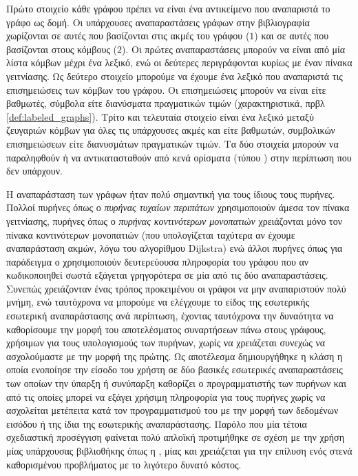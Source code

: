 Πρώτο στοιχείο κάθε γράφου πρέπει να είναι ένα αντικείμενο που αναπαριστά το γράφο ως δομή.
Οι υπάρχουσες αναπαραστάσεις γράφων στην βιβλιογραφία χωρίζονται σε αυτές που βασίζονται στις ακμές του γράφου ($1$) και σε αυτές που βασίζονται στους κόμβους ($2$).
Οι πρώτες αναπαραστάσεις μπορούν να είναι από μία λίστα κόμβων μέχρι ένα λεξικό, ενώ οι δεύτερες περιγράφονται κυρίως με έναν πίνακα γειτνίασης.
Ως δεύτερο στοιχείο μπορούμε να έχουμε ένα λεξικό που αναπαριστά τις επισημειώσεις των κόμβων του γράφου. Οι επισημειώσεις μπορούν να είναι είτε βαθμωτές, σύμβολα είτε διανύσματα πραγματικών τιμών (χαρακτηριστικά, πρβλ \ref{def:labeled_graphs}).
Τρίτο και τελευταία στοιχείο είναι ένα λεξικό μεταξύ ζευγαριών κόμβων για όλες τις υπάρχουσες ακμές και είτε βαθμωτών, συμβολικών επισημειώσεων είτε διανυσμάτων πραγματικών τιμών.
Τα δύο στοιχεία μπορούν να παραληφθούν ή να αντικατασταθούν από κενά ορίσματα (τύπου ) στην περίπτωση που δεν υπάρχουν.

Η αναπαράσταση των γράφων ήταν πολύ σημαντική για τους ίδιους τους πυρήνες.
Πολλοί πυρήνες όπως ο \textit{πυρήνας τυχαίων περιπάτων} χρησιμοποιούν άμεσα τον πίνακα γειτνίασης, πυρήνες όπως ο \textit{πυρήνας κοντινότερων μονοπατιών} χρειάζονται μόνο τον πίνακα κοντινότερων μονοπατιών (που υπολογίζεται ταχύτερα αν έχουμε αναπαράσταση ακμών, λόγω του αλγορίθμου Dijkstra) ενώ άλλοι πυρήνες όπως για παράδειγμα ο  χρησιμοποιούν δευτερεύουσα πληροφορία του γράφου που αν κωδικοποιηθεί σωστά εξάγεται γρηγορότερα σε μία από τις δύο αναπαραστάσεις.
Συνεπώς χρειάζονταν ένας τρόπος προκειμένου οι γράφοι να μην αναπαριστούν πολύ μνήμη, ενώ ταυτόχρονα να μπορούμε να ελέγχουμε το είδος της εσωτερικής εσωτερική αναπαράστασης ανά περίπτωση, έχοντας ταυτόχρονα την δυναότητα να καθορίσουμε την μορφή του αποτελέσματος συναρτήσεων πάνω στους γράφους, χρήσιμων για τους υπολογισμούς των πυρήνων, χωρίς να χρειάζεται συνεχώς να ασχολούμαστε με την μορφή της πρώτης.
Ως αποτέλεσμα δημιουργήθηκε η κλάση  η οποία ενοποίησε την είσοδο του χρήστη σε δύο βασικές εσωτερικές αναπαραστάσεις των οποίων την ύπαρξη ή συνύπαρξη καθορίζει ο προγραμματιστής των πυρήνων και από τις οποίες μπορεί να εξάγει χρήσιμη πληροφορία για τους πυρήνες χωρίς να ασχολείται μετέπειτα κατά τον προγραμματισμού του με την μορφή των δεδομένων εισόδου ή της ίδια της εσωτερικής αναπαράστασης.
Παρόλο που μία τέτοια σχεδιαστική προσέγγιση φαίνεται πολύ απλοϊκή προτιμήθηκε σε σχέση με την χρήση μίας υπάρχουσας βιβλιοθήκης όπως η , μίας και χρειάζεται για την επίλυση ενός στενά καθορισμένου προβλήματος με το λιγότερο δυνατό κόστος.

